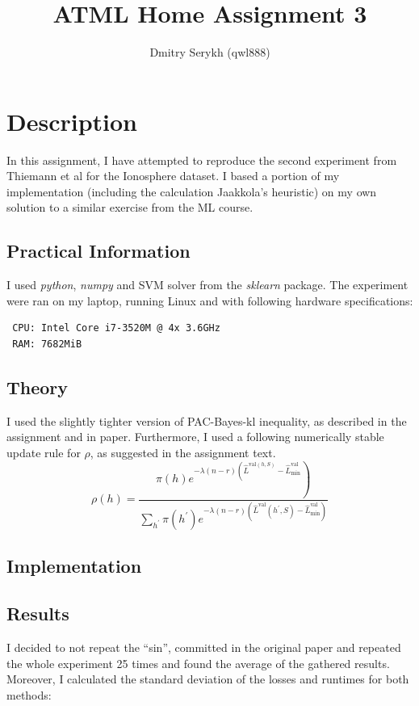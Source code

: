 \documentclass[a4paper]{article}
\title{\vspace{-5cm}ATML Home Assignment 3}
\author{Dmitry Serykh (qwl888)}
\begin{document}
\maketitle
\section{Description}
In this assignment, I have attempted to reproduce the second experiment from
Thiemann et al for the Ionosphere dataset. I based a portion of my implementation
(including the calculation Jaakkola's heuristic) on my own solution to a similar
exercise from the ML course. 
\subsection{Practical Information}
I used \emph{python}, \emph{numpy} and SVM solver
from the \emph{sklearn} package. The experiment were ran on my laptop, running
Linux and with following hardware specifications:
\begin{verbatim}
 CPU: Intel Core i7-3520M @ 4x 3.6GHz
 RAM: 7682MiB
\end{verbatim}

\subsection{Theory}
I used the slightly tighter version of PAC-Bayes-kl inequality, as described in
the assignment and in paper. Furthermore, I used a following numerically stable
update rule for $\rho$, as suggested in the assignment text.
\[
\rho(h) = 
\frac{\left.\pi(h) e^{-\lambda(n-r)\left(\hat{L}^{\mathrm{val}(h, S)}-\hat{L}_{\mathrm{min}}^{\mathrm{val}}\right.}\right)}{\sum_{h^{\prime}} \pi\left(h^{\prime}\right) e^{-\lambda(n-r)\left(\hat{L}^{\mathrm{val}}\left(h^{\prime}, S\right)-\hat{L}_{\mathrm{min}}^{\mathrm{val}}\right)}}
\]

\subsection{Implementation}

\subsection{Results}
I decided to not repeat the ``sin'', committed in the original paper and
repeated the whole experiment 25 times and found the average of the gathered
results. Moreover, I calculated the standard deviation of the losses and
runtimes for both methods:
\end{document}
